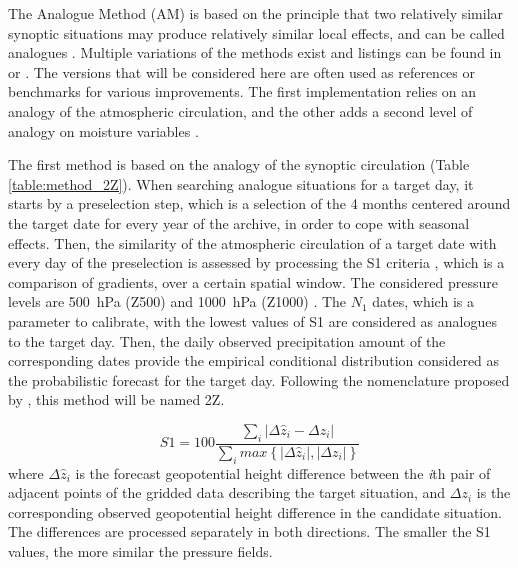 \documentclass[hess]{copernicus}
\begin{document}
\introduction  %

The Analogue Method (AM) is based on the principle that two relatively similar synoptic situations may produce relatively similar local effects, and can be called analogues \citep{Lorenz1956, Lorenz1969}. Multiple variations of the methods exist and listings can be found in \citet{Horton2016} or \citet{BenDaoud2015}. The versions that will be considered here are often used as references or benchmarks for various improvements. The first implementation relies on an analogy of the atmospheric circulation, and the other adds a second level of analogy on moisture variables \citep{Obled2002, Bontron2005, Marty2012}.

The first method is based on the analogy of the synoptic circulation (Table \ref{table:method_2Z}). When searching analogue situations for a target day, it starts by a preselection step, which is a selection of the 4 months centered around the target date for every year of the archive, in order to cope with seasonal effects. Then, the similarity of the atmospheric circulation of a target date with every day of the preselection is assessed by processing the S1 criteria \citep[Eq.\ \ref{eq:S1}, ][]{Teweles1954, Drosdowsky2003}, which is a comparison of gradients, over a certain spatial window. The considered pressure levels are 500~hPa (Z500) and 1000~hPa (Z1000) \citep{Bontron2005}. The $N_{1}$ dates, which is a parameter to calibrate, with the lowest values of S1 are considered as analogues to the target day. Then, the daily observed precipitation amount of the corresponding dates provide the empirical conditional distribution considered as the probabilistic forecast for the target day. Following the nomenclature proposed by \citet{Horton2016}, this method will be named 2Z.

\begin{equation}
\label{eq:S1}
S1=100 \frac {\displaystyle \sum_{i} \vert \Delta\hat{z}_{i} - \Delta z_{i} \vert}
{\displaystyle \sum_{i} max\left\lbrace \vert \Delta\hat{z}_{i} \vert , \vert \Delta z_{i} \vert \right\rbrace }
\end{equation}
where $\Delta \hat{z}_{i}$ is the forecast geopotential height difference between the \textit{i}th pair of adjacent points of the gridded data describing the target situation, and $\Delta z_{i}$ is the corresponding observed geopotential height difference in the candidate situation. The differences are processed separately in both directions. The smaller the S1 values, the more similar the pressure fields.
\end{document}
